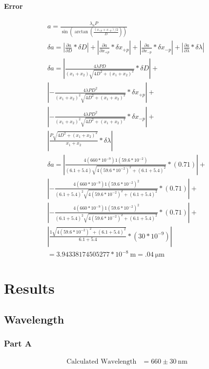 \documentclass{report}
\begin{document}
\subsubsection*{Error}
$$
\begin{gathered}
    a = \frac{\lambda_n  P}{\sin \left(\arctan \left( \frac{(x_{+p} + x_{-p})/2}{D} \right)\right)} \\
%
    \delta a=\left|\frac{\partial a}{\partial D} * \delta D\right|+\left|\frac{\partial a}{\partial x_{+p}} * \delta x_{+p}\right|+ \left|\frac{\partial a}{\partial x_{-p}} * \delta x_{-p}\right|+ \left|\frac{\partial a}{\partial \lambda} * \delta \lambda\right|\\
%
    \delta a=\left|\frac{4\lambda PD}{\left(x_1+x_2\right)\sqrt{4D^2+\left(x_1+x_2\right)^2}} * \delta D\right|+\\\left|-\frac{4\lambda PD^2}{\left(x_1+x_2\right)^2\sqrt{4D^2+\left(x_1+x_2\right)^2}} * \delta x_{+p}\right|  + \\ \left|-\frac{4\lambda PD^2}{\left(x_1+x_2\right)^2\sqrt{4D^2+\left(x_1+x_2\right)^2}} * \delta x_{-p}\right|  + \\ \left|\frac{P\sqrt{4D^2+\left(x_1+x_2\right)^2}}{x_1+x_2} * \delta \lambda\right|\\
%
    \delta a=\left|\frac{4(660 * 10^{-9}) 1(59.6 * 10^{-2})}{\left(6.1+5.4\right)\sqrt{4(59.6 * 10^{-2})^2+\left(6.1+5.4\right)^2}} * (0.71)\right|+\\\left|-\frac{4(660 * 10^{-9}) 1(59.6 * 10^{-2})^2}{\left(6.1+5.4\right)^2\sqrt{4(59.6 * 10^{-2})^2+\left(6.1+5.4\right)^2}} * (0.71)\right|  + \\ \left|-\frac{4(660 * 10^{-9}) 1(59.6 * 10^{-2})^2}{\left(6.1+5.4\right)^2\sqrt{4(59.6 * 10^{-2})^2+\left(6.1+5.4\right)^2}} * (0.71 )\right|  + \\ \left|\frac{1\sqrt{4(59.6 * 10^{-2})^2+\left(6.1+5.4\right)^2}}{6.1+5.4} * (30 * 10^{-9})\right|\\ = 3.94338174505277*10^{-8} \ \mathrm{m} = .04 \ \mathrm{\mu m}
\end{gathered}
$$



\chapter{Results}

\section*{Wavelength}
\subsection*{Part A}
\begin{equation*}
    \begin{aligned}
        \text{Calculated Wavelength} & = 660 \pm 30 \ \mathrm{nm} \\
    \end{aligned}
\end{equation*}
\end{document}

